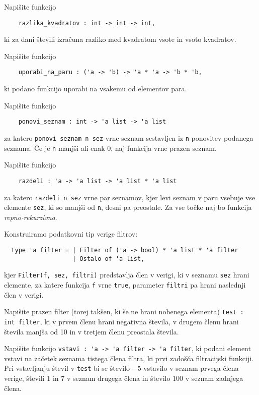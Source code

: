 \documentclass[arhiv]{../izpit}
\begin{document}

\naloga[]

\podnaloga
Napišite funkcijo
\begin{verbatim}
    razlika_kvadratov : int -> int -> int,
\end{verbatim}
ki za dani števili izračuna razliko med kvadratom vsote in vsoto kvadratov.

\podnaloga
Napišite funkcijo
\begin{verbatim}
    uporabi_na_paru : ('a -> 'b) -> 'a * 'a -> 'b * 'b,
\end{verbatim}
ki podano funkcijo uporabi na vsakemu od elementov para.

\podnaloga
Napišite funkcijo
\begin{verbatim}
    ponovi_seznam : int -> 'a list -> 'a list
\end{verbatim}
za katero \verb|ponovi_seznam n sez| vrne seznam sestavljen iz \verb|n| ponovitev podanega seznama.
Če je \verb|n| manjši ali enak $0$, naj funkcija vrne prazen seznam.

\podnaloga
Napišite funkcijo
\begin{verbatim}
    razdeli : 'a -> 'a list -> 'a list * 'a list
\end{verbatim}
za katero \verb|razdeli n sez| vrne par seznamov, kjer levi seznam v paru vsebuje vse elemente \verb|sez|,
ki so manjši od \verb|n|, desni pa preostale.
Za vse točke naj bo funkcija \emph{repno-rekurzivna}.

\naloga[]
Konstruiramo podatkovni tip verige filtrov:
\begin{verbatim}
  type 'a filter = | Filter of ('a -> bool) * 'a list * 'a filter
                   | Ostalo of 'a list,
\end{verbatim}
kjer \verb|Filter(f, sez, filtri)| predstavlja člen v verigi, ki v seznamu \verb|sez| hrani elemente,
za katere funkcija \verb|f| vrne \verb|true|, parameter \verb|filtri| pa hrani naslednji člen v verigi.

\podnaloga
Napišite prazen filter (torej takšen, ki še ne hrani nobenega elementa) \verb|test : int filter|,
ki v prvem členu hrani negativna števila, v drugem členu hrani števila manjša od 10 in
v tretjem členu preostala števila.

\podnaloga
Napišite funkcijo \verb|vstavi : 'a -> 'a filter -> 'a filter|,
ki podani element vstavi na začetek seznama tistega člena filtra, ki prvi zadošča filtracijski funkciji.
Pri vstavljanju števil v \verb|test| bi se število $-5$ vstavilo v seznam prvega člena verige,
števili $1$ in $7$ v seznam drugega člena in število $100$ v seznam zadnjega člena.
\end{document}
